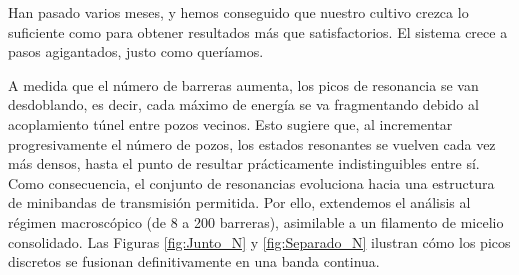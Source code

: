 \documentclass[a4paper,12pt]{article}
\begin{document}

Han pasado varios meses, y hemos conseguido que nuestro cultivo crezca lo suficiente como para obtener resultados más que satisfactorios. El sistema crece a pasos agigantados, justo como queríamos.

A medida que el número de barreras aumenta, los picos de resonancia se van desdoblando, es decir, cada máximo de energía se va fragmentando debido al acoplamiento túnel entre pozos vecinos.
Esto sugiere que, al incrementar progresivamente el número de pozos, los estados resonantes se vuelven cada vez más densos, hasta el punto de resultar prácticamente indistinguibles entre sí. Como consecuencia, el conjunto de resonancias evoluciona hacia una estructura de minibandas de transmisión permitida.
Por ello, extendemos el análisis al régimen macroscópico (de 8 a 200 barreras), asimilable a un filamento de micelio consolidado. Las Figuras \ref{fig:Junto_N} y \ref{fig:Separado_N} ilustran cómo los picos discretos se fusionan definitivamente en una banda continua.
\end{document}
